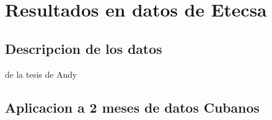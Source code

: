 \chapter{Resultados en datos de Etecsa}\label{chapter:implementation}

\section{Descripcion de los datos}

de la tesis de Andy

\section{Aplicacion a 2 meses de datos Cubanos}

